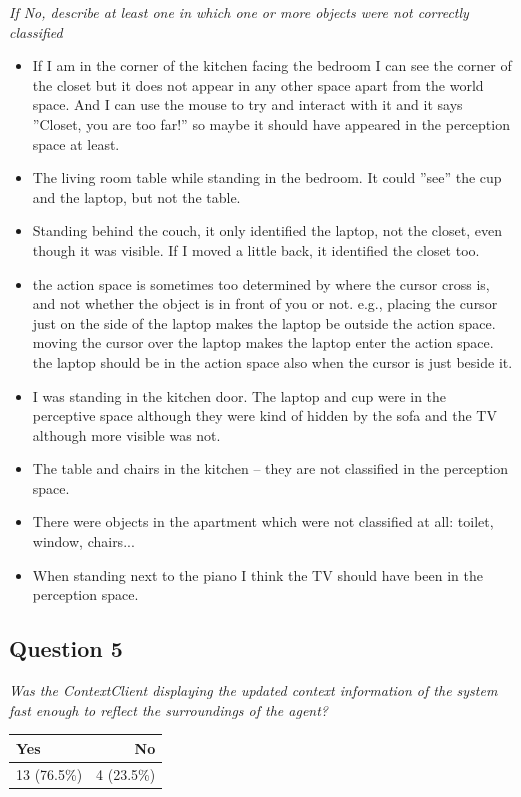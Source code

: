 \emph{If No, describe at least one in which one or more objects were not correctly classified}
\begin{itemize}
	\item If I am in the corner of the kitchen facing the bedroom I can see the corner of the closet but it does not appear in any other space apart from the world space. And I can use the mouse to try and interact with it and it says ''Closet, you are too far!'' so maybe it should have appeared in the perception space at least.
	\item The living room table while standing in the bedroom. It could ''see'' the cup and the laptop, but not the table.
	\item Standing behind the couch, it only identified the laptop, not the closet, even though it was visible. If I moved a little back, it identified the closet too.
	\item the action space is sometimes too determined by where the cursor cross is, and not whether the object is in front of you or not. e.g., placing the cursor just on the side of the laptop makes the laptop be outside the action space. moving the cursor over the laptop makes the laptop enter the action space. the laptop should be in the action space also when the cursor is just beside it.
	\item I was standing in the kitchen door. The laptop and cup were in the perceptive space although they were kind of hidden by the sofa and the TV although more visible was not.
	\item The table and chairs in the kitchen -- they are not classified in the perception space.
	\item There were objects in the apartment which were not classified at all: toilet, window, chairs... 
	\item When standing next to the piano I think the TV should have been in the perception space.

\end{itemize}

\subsection{Question 5}\label{question1:5}
\emph{Was the ContextClient displaying the updated context information of the system fast enough to reflect the surroundings of the agent?}
\begin{table}[H]
	\begin{center}
		\small \begin{tabular*}{0.35\columnwidth}{lr}
			\\ \hline \hline
			Yes & No \\ \hline \hline

		 	13 (76.5\%) & 4 (23.5\%)\\ \hline
		\end{tabular*}
	\end{center}
\end{table}

